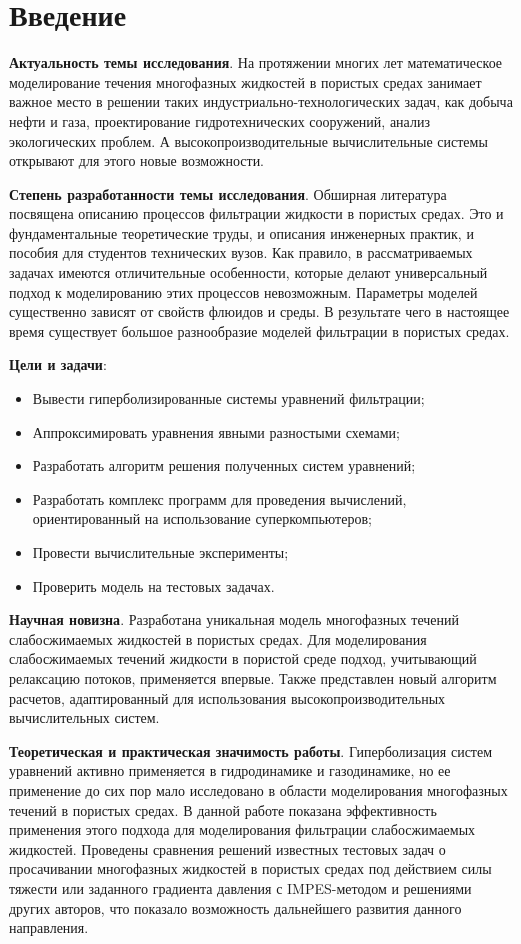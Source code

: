 \chapter*{Введение}                         %
\textbf{Актуальность темы исследования}. На протяжении многих лет математическое моделирование течения многофазных жидкостей в пористых средах занимает важное место в решении таких индустриально-технологических задач, как добыча нефти и газа, проектирование гидротехнических сооружений, анализ экологических проблем. 
А высокопроизводительные вычислительные системы открывают для этого новые возможности.

\textbf{Степень разработанности темы исследования}. Обширная литература посвящена описанию процессов фильтрации
жидкости в пористых средах. Это и фундаментальные теоретические труды, и описания инженерных практик, и пособия для студентов технических вузов. Как правило, в рассматриваемых задачах имеются отличительные особенности,
которые делают универсальный подход к моделированию этих процессов невозможным.
Параметры моделей существенно зависят от свойств флюидов и среды.
В результате чего в настоящее время существует большое разнообразие моделей фильтрации в пористых средах.

\textbf{Цели и задачи}:
\begin{itemize}
 \item Вывести гиперболизированные системы уравнений фильтрации;
 \item Аппроксимировать уравнения явными разностыми схемами;
 \item Разработать алгоритм решения полученных систем уравнений;
 \item Разработать комплекс программ для проведения вычислений, ориентированный на использование суперкомпьютеров;
 \item Провести вычислительные эксперименты;
 \item Проверить модель на тестовых задачах.
\end{itemize}

\textbf{Научная новизна}. Разработана уникальная модель многофазных течений слабосжимаемых жидкостей в пористых средах.
Для моделирования слабосжимаемых течений жидкости в пористой среде подход, учитывающий релаксацию потоков, применяется впервые.
Также представлен новый алгоритм расчетов, адаптированный для использования высокопроизводительных вычислительных систем.

\textbf{Теоретическая и практическая значимость работы}. Гиперболизация систем уравнений активно применяется в гидродинамике и газодинамике, но ее применение  до сих пор мало исследовано в области моделирования многофазных течений в пористых средах. В данной работе показана эффективность применения этого подхода для моделирования фильтрации слабосжимаемых жидкостей. Проведены сравнения решений известных тестовых задач о просачивании многофазных жидкостей в пористых средах под действием силы тяжести или заданного градиента давления с IMPES-методом и решениями других авторов, что показало возможность дальнейшего развития данного направления.

